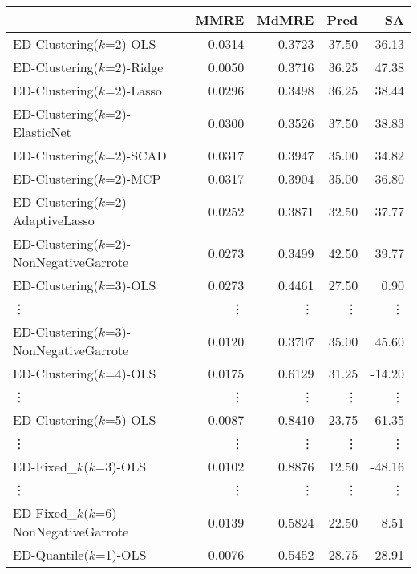 \begin{table*}[ht]
  \centering
  \captionsetup{labelformat=empty} %
  \caption{}
  \label{table:eval}
  \begin{tabular}{|l|r|r|r|r|}
      \hline
        ~ & MMRE & MdMRE & Pred & SA \\ \hline
        ED-Clustering($k$=2)-OLS & 0.0314  & 0.3723  & 37.50  & 36.13 \\ \hline
        ED-Clustering($k$=2)-Ridge & 0.0050  & 0.3716  & 36.25  & 47.38 \\ \hline
        ED-Clustering($k$=2)-Lasso & 0.0296  & 0.3498  & 36.25  & 38.44 \\ \hline
        ED-Clustering($k$=2)-ElasticNet & 0.0300  & 0.3526  & 37.50  & 38.83 \\ \hline
        ED-Clustering($k$=2)-SCAD & 0.0317  & 0.3947  & 35.00  & 34.82 \\ \hline
        ED-Clustering($k$=2)-MCP & 0.0317  & 0.3904  & 35.00  & 36.80 \\ \hline
        ED-Clustering($k$=2)-AdaptiveLasso & 0.0252  & 0.3871  & 32.50  & 37.77 \\ \hline
        ED-Clustering($k$=2)-NonNegativeGarrote & 0.0273  & 0.3499  & 42.50  & 39.77 \\ \hline
        ED-Clustering($k$=3)-OLS & 0.0273  & 0.4461  & 27.50  & 0.90 \\ \hline
        \vdots & \vdots & \vdots & \vdots & \vdots  \\ \hline
        ED-Clustering($k$=3)-NonNegativeGarrote & 0.0120  & 0.3707  & 35.00  & 45.60 \\ \hline
        ED-Clustering($k$=4)-OLS & 0.0175  & 0.6129  & 31.25  & -14.20 \\ \hline
        \vdots & \vdots & \vdots & \vdots & \vdots  \\ \hline
        ED-Clustering($k$=5)-OLS & 0.0087  & 0.8410  & 23.75  & -61.35 \\ \hline
        \vdots & \vdots & \vdots & \vdots & \vdots  \\ \hline
        ED-Fixed\_$k$($k$=3)-OLS & 0.0102  & 0.8876  & 12.50  & -48.16 \\ \hline
        \vdots & \vdots & \vdots & \vdots & \vdots  \\ \hline
        ED-Fixed\_$k$($k$=6)-NonNegativeGarrote & 0.0139  & 0.5824  & 22.50  & 8.51 \\ \hline
        ED-Quantile($k$=1)-OLS & 0.0076  & 0.5452  & 28.75  & 28.91 \\ \hline

\end{tabular}
\end{table*}
